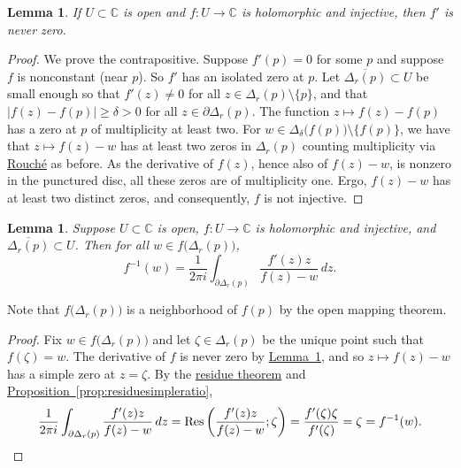 \documentclass[12pt,openany]{book}
\newcommand{\sabs}[1]{\lvert {#1} \rvert}
\newcommand{\C}{{\mathbb{C}}}
\theoremstyle{plain}
\newtheorem{lemma}[thm]{Lemma}
\theoremstyle{remark}
\theoremstyle{definition}
\theoremstyle{exercise}
\theoremstyle{example}
\newcommand{\propref}[1]{\hyperref[#1]{Proposition~\ref*{#1}}}
\newcommand{\lemmaref}[1]{\hyperref[#1]{Lemma~\ref*{#1}}}
\begin{document}
\begin{lemma} \label{lemma:dernonzero}
If $U \subset \C$ is open and $f \colon U \to \C$ is holomorphic and injective, then
$f'$ is never zero.
\end{lemma}

\begin{proof}
We prove the contrapositive.
Suppose $f'(p) = 0$ for some $p$
and suppose $f$ is nonconstant (near $p$).
So $f'$ has
an isolated zero at $p$.
Let $\overline{\Delta_r(p)} \subset U$
be small enough so that $f'(z) \neq 0$ for all $z \in \Delta_r(p) \setminus \{ p \}$,
and that $\sabs{f(z)-f(p)} \geq \delta > 0$ for all $z \in \partial
\Delta_r(p)$.
The function $z \mapsto f(z) - f(p)$ has a zero at $p$ of multiplicity at least
two.
For $w \in \Delta_{\delta}\bigl(f(p)\bigr) \setminus \bigl\{ f(p) \bigr\}$,
we have that
$z \mapsto f(z)-w$ has at least two zeros in $\Delta_r(p)$ counting multiplicity via
\hyperref[thm:rouche2]{Rouch\'e} as
before.  As the derivative of $f(z)$, hence also of $f(z)-w$, is nonzero in
the punctured disc, all these zeros are of multiplicity one.  Ergo, $f(z)-w$
has at least two distinct zeros, and consequently, $f$ is not injective.
\end{proof}

\begin{lemma} \label{lemma:inverseasintegral}
Suppose $U \subset \C$ is open,
$f \colon U \to \C$ is holomorphic and injective, and
$\overline{\Delta_r(p)} \subset U$.  Then for all $w \in
f\bigl(\Delta_r(p)\bigr)$,
\begin{equation*}
f^{-1}(w) = \frac{1}{2\pi i} \int_{\partial \Delta_r(p)}
\frac{f'(z)z}{f(z)-w} \, dz .
\end{equation*}
\end{lemma}

Note that $f\bigl(\Delta_r(p)\bigr)$ is a neighborhood of $f(p)$
by the open mapping theorem.

\begin{proof}
Fix $w \in f\bigl(\Delta_r(p)\bigr)$ and let $\zeta \in \Delta_r(p)$
be the unique point
such that $f(\zeta) = w$.
The derivative of $f$ is never zero by \lemmaref{lemma:dernonzero},
and so $z \mapsto f(z)-w$ has a simple
zero at $z=\zeta$.  By the \hyperref[thm:residue]{residue theorem} and
\propref{prop:residuesimpleratio},
\begin{equation*}
\frac{1}{2\pi i} \int_{\partial \Delta_r(p)}
\frac{f'(z)z}{f(z)-w} \, dz
=
\operatorname{Res}\left(\frac{f'(z)z}{f(z)-w};\zeta\right)
=
\frac{f'(\zeta)\zeta}{f'(\zeta)} = \zeta = f^{-1}(w) .
\qedhere
\end{equation*}
\end{proof}
\end{document}
